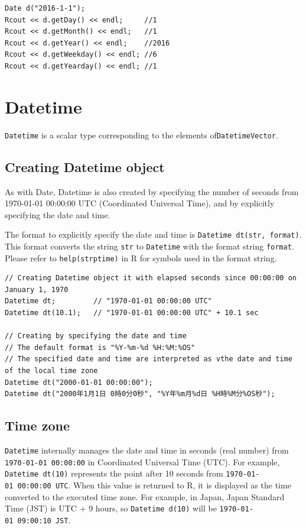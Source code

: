 \documentclass[]{book}
\begin{document}
\begin{verbatim}
Date d("2016-1-1");
Rcout << d.getDay() << endl;     //1
Rcout << d.getMonth() << endl;   //1
Rcout << d.getYear() << endl;    //2016
Rcout << d.getWeekday() << endl; //6
Rcout << d.getYearday() << endl; //1
\end{verbatim}

\hypertarget{datetime}{%
\chapter{Datetime}\label{datetime}}

\texttt{Datetime} is a scalar type corresponding to the elements of\texttt{DatetimeVector}.

\hypertarget{creating-datetime-object}{%
\section{Creating Datetime object}\label{creating-datetime-object}}

As with Date, Datetime is also created by specifying the number of seconds from 1970-01-01 00:00:00 UTC (Coordinated Universal Time), and by explicitly specifying the date and time.

The format to explicitly specify the date and time is \texttt{Datetime\ dt(str,\ format)}. This format converts the string \texttt{str} to \texttt{Datetime} with the format string \texttt{format}. Please refer to \texttt{help(strptime)} in R for symbols used in the format string.

\begin{verbatim}
// Creating Datetime object it with elapsed seconds since 00:00:00 on January 1, 1970
Datetime dt;         // "1970-01-01 00:00:00 UTC"
Datetime dt(10.1);   // "1970-01-01 00:00:00 UTC" + 10.1 sec

// Creating by specifying the date and time
// The default format is "%Y-%m-%d %H:%M:%OS"
// The specified date and time are interpreted as vthe date and time of the local time zone
Datetime dt("2000-01-01 00:00:00");
Datetime dt("2000年1月1日 0時0分0秒", "%Y年%m月%d日 %H時%M分%OS秒");
\end{verbatim}

\hypertarget{time-zone}{%
\section{Time zone}\label{time-zone}}

\texttt{Datetime} internally manages the date and time in seconds (real number) from \texttt{1970-01-01\ 00:00:00} in Coordinated Universal Time (UTC). For example, \texttt{Datetime\ dt(10)} represents the point after 10 seconds from \texttt{1970-01-01\ 00:00:00\ UTC}. When this value is returned to R, it is displayed as the time converted to the executed time zone. For example, in Japan, Japan Standard Time (JST) is UTC + 9 hours, so \texttt{Datetime\ d(10)} will be \texttt{1970-01-01\ 09:00:10\ JST}.
\end{document}
